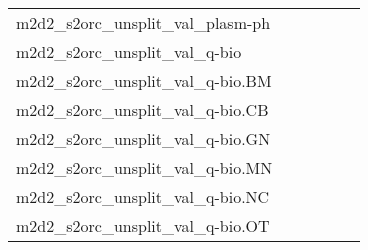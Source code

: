 {\begin{longtable}{m{6cm}m{1.7cm}m{1.7cm}m{1.7cm}m{1.7cm}m{1.7cm}}
	m2d2\_s2orc\_unsplit\_val\_plasm-ph  & \colorbox[HTML]{c3e698}{\makebox[\mywidth][c]{13.65}} & \colorbox[HTML]{e2f3a9}{\makebox[\mywidth][c]{13.81}} & \colorbox[HTML]{ffffe5}{\makebox[\mywidth][c]{15.77}} & \colorbox[HTML]{ceeb9e}{\makebox[\mywidth][c]{13.69}} & \colorbox[HTML]{77c578}{\makebox[\mywidth][c]{13.44}}\\
	m2d2\_s2orc\_unsplit\_val\_q-bio  & \colorbox[HTML]{bfe596}{\makebox[\mywidth][c]{13.69}} & \colorbox[HTML]{e4f4ab}{\makebox[\mywidth][c]{13.87}} & \colorbox[HTML]{ffffe5}{\makebox[\mywidth][c]{15.75}} & \colorbox[HTML]{cdeb9d}{\makebox[\mywidth][c]{13.75}} & \colorbox[HTML]{77c578}{\makebox[\mywidth][c]{13.50}}\\
	m2d2\_s2orc\_unsplit\_val\_q-bio.BM  & \colorbox[HTML]{9bd587}{\makebox[\mywidth][c]{13.28}} & \colorbox[HTML]{d9f0a3}{\makebox[\mywidth][c]{13.52}} & \colorbox[HTML]{ffffe5}{\makebox[\mywidth][c]{15.72}} & \colorbox[HTML]{c1e597}{\makebox[\mywidth][c]{13.41}} & \colorbox[HTML]{77c578}{\makebox[\mywidth][c]{13.19}}\\
	m2d2\_s2orc\_unsplit\_val\_q-bio.CB  & \colorbox[HTML]{9fd688}{\makebox[\mywidth][c]{12.06}} & \colorbox[HTML]{e5f4ab}{\makebox[\mywidth][c]{12.34}} & \colorbox[HTML]{ffffe5}{\makebox[\mywidth][c]{14.21}} & \colorbox[HTML]{c8e89a}{\makebox[\mywidth][c]{12.19}} & \colorbox[HTML]{77c578}{\makebox[\mywidth][c]{11.97}}\\
	m2d2\_s2orc\_unsplit\_val\_q-bio.GN  & \colorbox[HTML]{ffffe5}{\makebox[\mywidth][c]{13.21}} & \colorbox[HTML]{d1ec9f}{\makebox[\mywidth][c]{11.40}} & \colorbox[HTML]{ffffe5}{\makebox[\mywidth][c]{12.74}} & \colorbox[HTML]{bbe395}{\makebox[\mywidth][c]{11.32}} & \colorbox[HTML]{77c578}{\makebox[\mywidth][c]{11.16}}\\
	m2d2\_s2orc\_unsplit\_val\_q-bio.MN  & \colorbox[HTML]{e2f3a9}{\makebox[\mywidth][c]{11.96}} & \colorbox[HTML]{e0f2a8}{\makebox[\mywidth][c]{11.95}} & \colorbox[HTML]{ffffe5}{\makebox[\mywidth][c]{13.36}} & \colorbox[HTML]{d5eea1}{\makebox[\mywidth][c]{11.90}} & \colorbox[HTML]{77c578}{\makebox[\mywidth][c]{11.70}}\\
	m2d2\_s2orc\_unsplit\_val\_q-bio.NC  & \colorbox[HTML]{bfe596}{\makebox[\mywidth][c]{13.69}} & \colorbox[HTML]{e4f4ab}{\makebox[\mywidth][c]{13.87}} & \colorbox[HTML]{ffffe5}{\makebox[\mywidth][c]{15.75}} & \colorbox[HTML]{cdeb9d}{\makebox[\mywidth][c]{13.75}} & \colorbox[HTML]{77c578}{\makebox[\mywidth][c]{13.50}}\\
	m2d2\_s2orc\_unsplit\_val\_q-bio.OT  & \colorbox[HTML]{b8e293}{\makebox[\mywidth][c]{14.90}} & \colorbox[HTML]{c2e698}{\makebox[\mywidth][c]{14.94}} & \colorbox[HTML]{ffffe5}{\makebox[\mywidth][c]{17.16}} & \colorbox[HTML]{bde395}{\makebox[\mywidth][c]{14.92}} & \colorbox[HTML]{77c578}{\makebox[\mywidth][c]{14.73}}\\

\end{longtable}}
